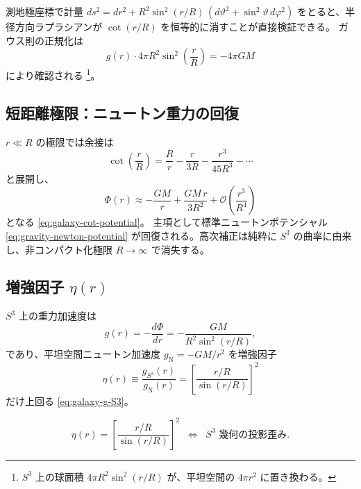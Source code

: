 \documentclass[dvipdfmx,a4paper,oneside]{jsbook}
\numberwithin{equation}{chapter}
\begin{document}
測地極座標で計量 \(ds^2 = dr^2 + R^2 \sin^2(r/R)\,(d\vartheta^2 + \sin^2\!\vartheta\, d\varphi^2)\) をとると、半径方向ラプラシアンが \(\cot(r/R)\) を恒等的に消すことが直接検証できる。
ガウス則の正規化は
\begin{equation}
  g(r) \cdot 4\pi R^2 \sin^2\!\left(\frac{r}{R}\right) = -4\pi GM
  \label{eq:galaxy-gauss}
\end{equation}
により確認される \footnote{\(S^3\) 上の球面積 \(4\pi R^2\sin^2(r/R)\) が、平坦空間の \(4\pi r^2\) に置き換わる。}。

\subsection{短距離極限：ニュートン重力の回復}

\(r \ll R\) の極限では余接は
\begin{equation}
  \cot\!\left(\frac{r}{R}\right) = \frac{R}{r} - \frac{r}{3R} - \frac{r^3}{45R^3} - \cdots
  \label{eq:galaxy-cot-expansion}
\end{equation}
と展開し、
\begin{equation}
  \Phi(r) \approx -\frac{GM}{r} + \frac{GM\,r}{3R^2} + \mathcal{O}\!\left(\frac{r^3}{R^4}\right)
  \label{eq:galaxy-newton-limit}
\end{equation}
となる \eqref{eq:galaxy-cot-potential}。
主項として標準ニュートンポテンシャル \eqref{eq:gravity-newton-potential} が回復される。高次補正は純粋に \(S^3\) の曲率に由来し、非コンパクト化極限 \(R \to \infty\) で消失する。

\subsection{増強因子 \(\eta(r)\)}

\(S^3\) 上の重力加速度は
\begin{equation}
  g(r) = -\frac{d\Phi}{dr} = -\frac{GM}{R^2 \sin^2(r/R)},
  \label{eq:galaxy-g-S3}
\end{equation}
であり、平坦空間ニュートン加速度 \(g_{\mathrm{N}} = -GM/r^2\) を増強因子
\begin{equation}
  \eta(r) \equiv \frac{g_{S^3}(r)}{g_{\mathrm{N}}(r)} = \left[\frac{r/R}{\sin(r/R)}\right]^2
  \label{eq:galaxy-eta}
\end{equation}
だけ上回る \eqref{eq:galaxy-g-S3}。

\begin{equation}
  \boxed{\;
  \eta(r) = \left[\frac{r/R}{\sin(r/R)}\right]^2
  \;\;\Longleftrightarrow\;\;
  S^3 \text{ 幾何の投影歪み}.
  \;}
  \label{eq:galaxy-eta-boxed}
\end{equation}
\end{document}
